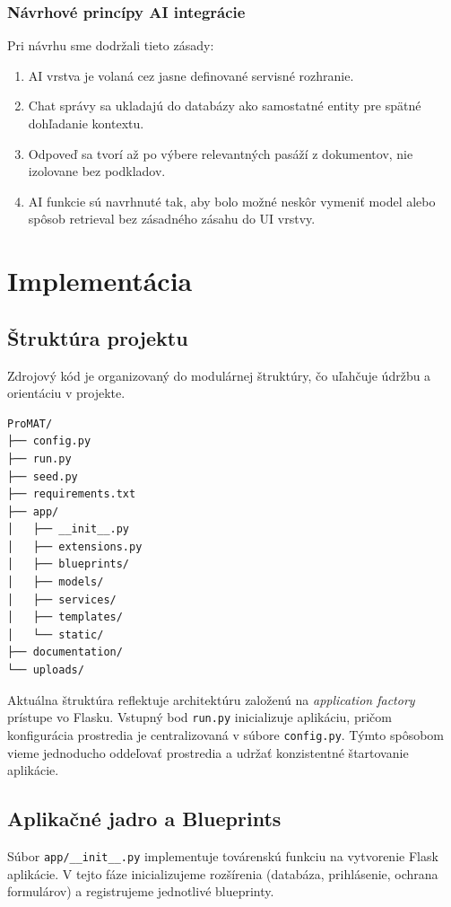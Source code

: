 \documentclass[12pt, a4paper]{article}
\begin{document}
\begin{titlepage}
\subsubsection{Návrhové princípy AI integrácie}
Pri návrhu sme dodržali tieto zásady:
\begin{enumerate}
    \item AI vrstva je volaná cez jasne definované servisné rozhranie.
    \item Chat správy sa ukladajú do databázy ako samostatné entity pre spätné dohľadanie kontextu.
    \item Odpoveď sa tvorí až po výbere relevantných pasáží z dokumentov, nie izolovane bez podkladov.
    \item AI funkcie sú navrhnuté tak, aby bolo možné neskôr vymeniť model alebo spôsob retrieval bez zásadného zásahu do UI vrstvy.
\end{enumerate}


\newpage
\section{Implementácia}

\subsection{Štruktúra projektu}
Zdrojový kód je organizovaný do modulárnej štruktúry, čo uľahčuje údržbu a orientáciu v projekte.
\begin{verbatim}
ProMAT/
├── config.py
├── run.py
├── seed.py
├── requirements.txt
├── app/
│   ├── __init__.py
│   ├── extensions.py
│   ├── blueprints/
│   ├── models/
│   ├── services/
│   ├── templates/
│   └── static/
├── documentation/
└── uploads/
\end{verbatim}

Aktuálna štruktúra reflektuje architektúru založenú na \textit{application factory} prístupe vo Flasku. Vstupný bod \texttt{run.py} inicializuje aplikáciu, pričom konfigurácia prostredia je centralizovaná v súbore \texttt{config.py}. Týmto spôsobom vieme jednoducho oddeľovať prostredia a udržať konzistentné štartovanie aplikácie.

\subsection{Aplikačné jadro a Blueprints}
Súbor \texttt{app/\_\_init\_\_.py} implementuje továrenskú funkciu na vytvorenie Flask aplikácie. V tejto fáze inicializujeme rozšírenia (databáza, prihlásenie, ochrana formulárov) a registrujeme jednotlivé blueprinty.


\end{titlepage}
\end{document}
